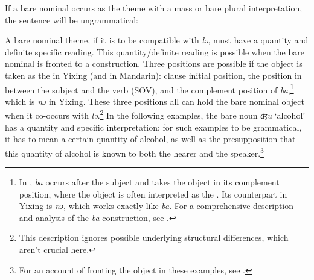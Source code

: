 \documentclass[output=paper]{langsci/langscibook}
\begin{document}
If a bare nominal occurs as the theme with a mass or bare plural
interpretation, the sentence will be ungrammatical:

\begin{exe}
\ex {} \begin{xlist}

\end{xlist}
\end{exe}

A bare nominal theme, if it is to be compatible with \emph{lə}, must have a quantity
and definite specific reading. This quantity/definite reading is possible when
the bare nominal is fronted to a  construction. Three positions are
possible if the object is taken as the  in Yixing (and in Mandarin):
clause initial position, the position in between the subject and the verb
(SOV), and the complement position of \emph{ba},\footnote{In , \emph{ba}
occurs after the subject and takes the object in its complement position,
where the object is often interpreted as the . Its counterpart in Yixing is
\emph{nɔ}, which works exactly like \emph{ba}. For a comprehensive description
and analysis of the \emph{ba}-construction, see
\textcite[153--196]{HuangEtal2009}.} which is \emph{nɔ} in Yixing. These three
positions all can hold the bare nominal object when it co-occurs with
\emph{lə}.\footnote{This description ignores possible underlying structural
    differences, which aren’t crucial here.} In the following examples, the
    bare noun \emph{ʤu} `alcohol' has a quantity and specific interpretation:
    for such examples to be grammatical, it has to mean a certain quantity of
    alcohol, as well as the presupposition that this quantity of alcohol is
    known to both the hearer and the speaker.\footnote{For an account of
    fronting the object in these examples, see
\textcite{Huxuhui2016}.}
\end{document}
